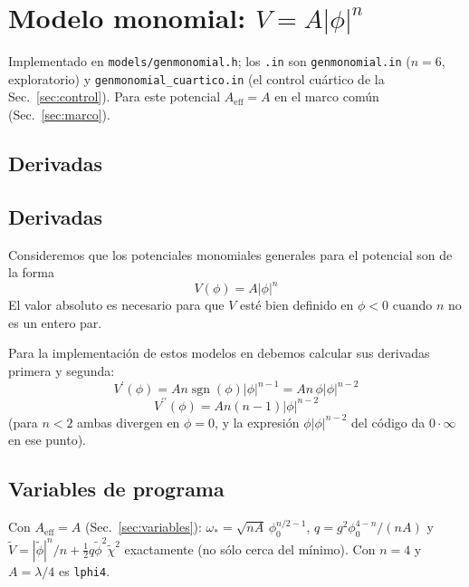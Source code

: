     \section{Modelo monomial: $V = A|\phi|^n$}
        \label{sec:monomial}

        Implementado en \texttt{models/genmonomial.h}; los \texttt{.in} son \texttt{genmonomial.in} ($n = 6$, exploratorio) y \texttt{genmonomial\_cuartico.in} (el control cuártico de la Sec.~\ref{sec:control}). Para este potencial $A_{\text{eff}} = A$ en el marco común (Sec.~\ref{sec:marco}).

        \subsection{Derivadas}

        \subsection{Derivadas}

            Consideremos que los potenciales monomiales generales para el potencial son de la forma
            \begin{equation}
                V(\phi) = A \left| \phi \right|^n
            \end{equation}
            El valor absoluto es necesario para que $V$ esté bien definido en $\phi < 0$ cuando $n$ no es un entero par.

            Para la implementación de estos modelos en \CosmoLattice debemos calcular sus derivadas primera y segunda:
            \begin{equation}
                V^\prime (\phi) = A n \operatorname{sgn}(\phi) \left| \phi \right|^{n - 1} = A n \, \phi \left| \phi \right|^{n - 2}
            \end{equation}
            \begin{equation}
                V^{\prime \prime} (\phi) = A n (n - 1) \left| \phi \right|^{n - 2}
            \end{equation}
            (para $n < 2$ ambas divergen en $\phi = 0$, y la expresión $\phi |\phi|^{n-2}$ del código da $0 \cdot \infty$ en ese punto).

        \subsection{Variables de programa}

            Con $A_{\text{eff}} = A$ (Sec.~\ref{sec:variables}): $\omega_* = \sqrt{nA}\,\phi_0^{n/2-1}$, $q = g^2\phi_0^{4-n}/(nA)$ y $\tilde V = |\tilde\phi|^n/n + \tfrac12 q\tilde\phi^2\tilde\chi^2$ exactamente (no sólo cerca del mínimo). Con $n = 4$ y $A = \lambda/4$ es \texttt{lphi4}.

